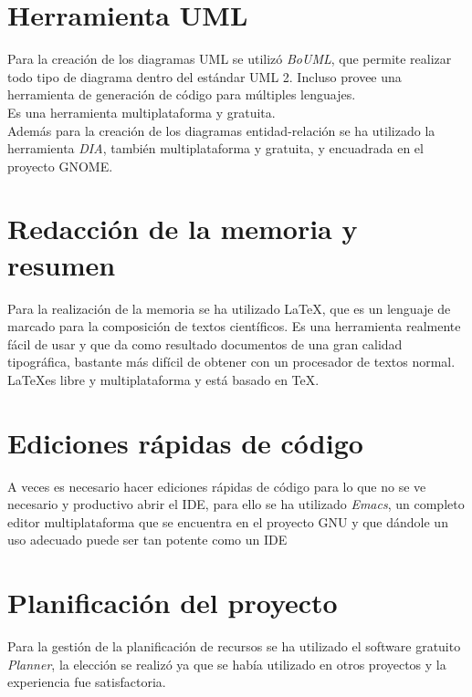 \section{Herramienta UML}

Para la creación de los diagramas UML se utilizó {\em BoUML}, que permite realizar todo tipo de diagrama dentro del estándar UML 2. Incluso provee una herramienta de generación de código para múltiples lenguajes.
\\
Es una herramienta multiplataforma y gratuita.\\

Además para la creación de los diagramas entidad-relación se ha utilizado la herramienta {\em DIA}, también multiplataforma y gratuita, y encuadrada en el proyecto GNOME.

\section{Redacción de la memoria y resumen}

Para la realización de la memoria se ha utilizado \LaTeX, que es un lenguaje de marcado para la composición de textos científicos. Es una herramienta realmente fácil de usar y que da como resultado documentos de una gran calidad tipográfica, bastante más difícil de obtener con un procesador de textos normal.\\

\LaTeX es libre y multiplataforma y está basado en \TeX.

\section{Ediciones rápidas de código}

A veces es necesario hacer ediciones rápidas de código para lo que no se ve necesario y productivo abrir el IDE, para ello se ha utilizado {\em Emacs}, un completo editor multiplataforma que se encuentra en el proyecto GNU y que dándole un uso adecuado puede ser tan potente como un IDE

\section{Planificación del proyecto}

Para la gestión de la planificación de recursos se ha utilizado el software gratuito {\em Planner}, la elección se realizó ya que se había utilizado en otros proyectos y la experiencia fue satisfactoria.

